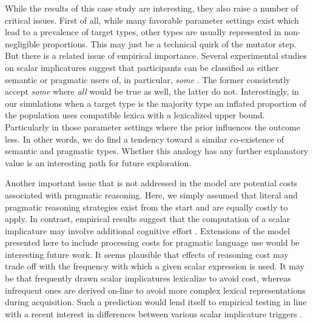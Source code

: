 \documentclass[a4paper, 11pt]{article}
\theoremstyle{Satz}
\begin{document}
While the results of this case study are interesting, they also raise a number of critical
issues. First of all, while many favorable parameter settings exist which lead to a prevalence
of target types, other types are usually represented in non-negligible proportions. This may
just be a technical quirk of the mutator step. But there is a related issue of empirical
importance. Several experimental studies on scalar implicatures suggest that participants can
be classified as either semantic or pragmatic users of, in particular, \emph{some}
\citep[e.g.][]{BottNoveck2004:Some-Utterances,NieuwlandDitman2010:On-the-incremen,DegenTanenhaus2012:Processing-Scal}. The
former consistently accept \emph{some} where \emph{all} would be true as well, the latter do
not. Interestingly, in our simulations when a target type is the majority type an inflated
proportion of the population uses compatible lexica with a lexicalized upper
bound. Particularly in those parameter settings where the prior influences the outcome less. In
other words, we do find a tendency toward a similar co-existence of semantic and pragmatic
types. Whether this analogy has any further explanatory value is an interesting path for future
exploration.

Another important issue that is not addressed in the model are potential costs associated with
pragmatic reasoning. Here, we simply assumed that literal and pragmatic reasoning strategies
exist from the start and are equally costly to apply. In contrast, empirical results suggest
that the computation of a scalar implicature may involve additional cognitive effort
\citep[e.g.][]{BrehenyKatsos2006:Are-Generalised,deNeys+schaeken:2007,huang+snedeker:2009,Jr.Bailey2013:Possibly-all-of}. Extensions
of the model presented here to include processing costs for pragmatic language use would be
interesting future work. It seems plausible that effects of reasoning cost may trade off with
the frequency with which a given scalar expression is used. It may be that frequently drawn
scalar implicatures lexicalize to avoid cost, whereas infrequent ones are derived on-line to
avoid more complex lexical representations during acquisition. Such a prediction would lend itself to
empirical testing in line with a recent interest in differences between various scalar
implicature triggers \citep{Tielvan-TielMiltenburgvan-Miltenburg2014:Scalar-Diversit}. 
\end{document}
